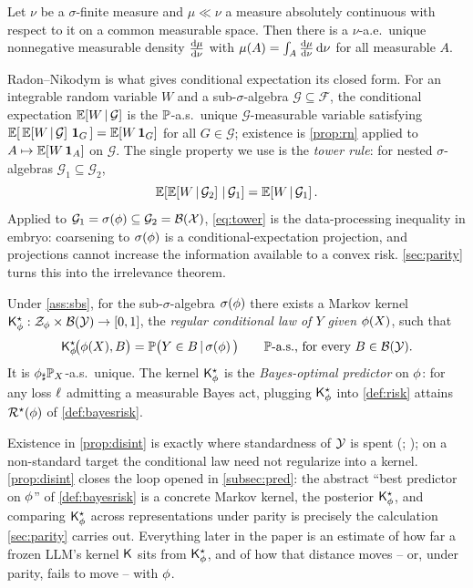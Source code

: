 \begin{proposition}
\label{prop:rn}
Let $\nu$ be a $\sigma$-finite measure and $\mu \ll \nu$ a measure absolutely
continuous with respect to it on a common measurable space. Then there is a
$\nu$-a.e.\ unique nonnegative measurable density $\frac{\mathrm{d}\mu}{\mathrm{d}\nu}$ with
$\mu(A) = \int_A \frac{\mathrm{d}\mu}{\mathrm{d}\nu}\,\mathrm{d}\nu$ for all measurable $A$.
\end{proposition}

Radon--Nikodym is what gives conditional expectation its closed form.
For an integrable random variable $W$ and a sub-$\sigma$-algebra
$\mathcal{G} \subseteq \mathcal{F}$, the conditional expectation
$\mathbb{E}\!\left[W \,\vert\, \mathcal{G}\right]$ is the $\mathbb{P}$-a.s.\ unique
$\mathcal{G}$-measurable variable satisfying $\mathbb{E}[\,\mathbb{E}\!\left[W \,\vert\, \mathcal{G}\right]
\,\mathbf{1}_G\,] = \mathbb{E}[W\,\mathbf{1}_G]$ for all $G \in \mathcal{G}$;
existence is \cref{prop:rn} applied to $A \mapsto \mathbb{E}[W\,\mathbf{1}_A]$ on
$\mathcal{G}$. The single property we use is the \emph{tower rule}: for nested
$\sigma$-algebras $\mathcal{G}_1 \subseteq \mathcal{G}_2$,
\begin{equation}
  \label{eq:tower}
  \mathbb{E}\!\left[\mathbb{E}\!\left[W \,\vert\, \mathcal{G}_2\right] \,\vert\, \mathcal{G}_1\right]
  = \mathbb{E}\!\left[W \,\vert\, \mathcal{G}_1\right].
\end{equation}
Applied to $\mathcal{G}_1 = \sigma\!\left(\phi\right) \subseteq \mathcal{G}_2 = \mathcal{B}(\mathcal{X})$,
\cref{eq:tower} is the data-processing inequality in embryo: coarsening to
$\sigma\!\left(\phi\right)$ is a conditional-expectation projection, and projections cannot
increase the information available to a convex risk. \cref{sec:parity} turns
this into the irrelevance theorem.

\begin{proposition}
\label{prop:disint}
Under \cref{ass:sbs}, for the sub-$\sigma$-algebra $\sigma\!\left(\phi\right)$ there exists a
Markov kernel $\mathsf{K}^{\star}_{\phi} : \mathcal{Z}_{\phi} \times \mathcal{B}(\mathcal{Y}) \to [0,1]$,
the \emph{regular conditional law of $Y$ given $\phi(X)$}, such that
\[
  \mathsf{K}^{\star}_{\phi}\!\big(\phi(X), B\big)
  = \mathbb{P}\big(Y \in B \,\vert\, \sigma\!\left(\phi\right)\big)
  \qquad \mathbb{P}\text{-a.s., for every } B \in \mathcal{B}(\mathcal{Y}).
\]
It is ${\phi}_{\sharp}\mathbb{P}_X$-a.s.\ unique. The kernel $\mathsf{K}^{\star}_{\phi}$ is the
\emph{Bayes-optimal predictor} on $\phi$: for any loss $\ell$ admitting a
measurable Bayes act, plugging $\mathsf{K}^{\star}_{\phi}$ into \cref{def:risk} attains
$\mathcal{R}^{\star}(\phi)$ of \cref{def:bayesrisk}.
\end{proposition}

Existence in \cref{prop:disint} is exactly where standardness of $\mathcal{Y}$ is
spent (\citealp[Thm.~6.3]{kallenberg2002foundations};
\citealp[Ch.~IV]{cinlar2011probability}); on a non-standard target the
conditional law need not regularize into a kernel. \cref{prop:disint} closes
the loop opened in \cref{subsec:pred}: the abstract ``best predictor on
$\phi$'' of \cref{def:bayesrisk} is a concrete Markov kernel, the posterior
$\mathsf{K}^{\star}_{\phi}$, and comparing $\mathsf{K}^{\star}_{\phi}$ across representations under parity
is precisely the calculation \cref{sec:parity} carries out. Everything later
in the paper is an estimate of how far a frozen LLM's kernel $\mathsf{K}$
sits from $\mathsf{K}^{\star}_{\phi}$, and of how that distance moves -- or, under parity,
fails to move -- with $\phi$.
